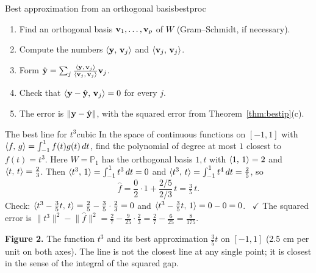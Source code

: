 \documentclass[11pt]{article}
\begin{document}
\begin{proc}{Best approximation from an orthogonal basis}{bestproc}
\begin{enumerate}[nosep]
  \item Find an orthogonal basis $\mathbf{v}_1,\dots,\mathbf{v}_p$ of $W$ (Gram--Schmidt, if necessary).
  \item Compute the numbers $\langle \mathbf{y},\,\mathbf{v}_j\rangle$ and $\langle \mathbf{v}_j,\,\mathbf{v}_j\rangle$.
  \item Form $\hat{\mathbf{y}}=\sum_j\frac{\langle \mathbf{y},\,\mathbf{v}_j\rangle}{\langle \mathbf{v}_j,\,\mathbf{v}_j\rangle}\mathbf{v}_j$.
  \item Check that $\langle \mathbf{y}-\hat{\mathbf{y}},\,\mathbf{v}_j\rangle=0$ for every $j$.
  \item The error is $\lVert\mathbf{y}-\hat{\mathbf{y}}\rVert$, with the squared error from Theorem~\ref{thm:bestip}(c).
\end{enumerate}
\end{proc}

\begin{exmp}{The best line for $t^3$}{cubic}
In the space of continuous functions on $[-1,1]$ with $\langle f,\,g\rangle=\int_{-1}^1f(t)g(t)\,dt$, find the polynomial of degree at most $1$ closest to $f(t)=t^3$. Here $W=\mathbb{P}_1$ has the orthogonal basis $1,t$ with $\langle 1,\,1\rangle=2$ and $\langle t,\,t\rangle=\tfrac23$. Then $\langle t^3,\,1\rangle=\int_{-1}^1t^3\,dt=0$ and $\langle t^3,\,t\rangle=\int_{-1}^1t^4\,dt=\tfrac25$, so
\[
\hat{f}=\frac02\cdot1+\frac{2/5}{2/3}\,t=\tfrac35\,t .
\]
Check: $\langle t^3-\tfrac35t,\,t\rangle=\tfrac25-\tfrac35\cdot\tfrac23=0$ and $\langle t^3-\tfrac35t,\,1\rangle=0-0=0$. \ $\checkmark$ The squared error is $\lVert t^3\rVert^2-\lVert\hat f\rVert^2=\tfrac27-\tfrac9{25}\cdot\tfrac23=\tfrac27-\tfrac6{25}=\tfrac8{175}$.
\end{exmp}

\begin{center}
\end{center}

\noindent\textbf{Figure 2.} The function $t^3$ and its best approximation $\tfrac35t$ on $[-1,1]$ (2.5 cm per unit on both axes). The line is not the closest line at any single point; it is closest in the sense of the integral of the squared gap.
\end{document}
